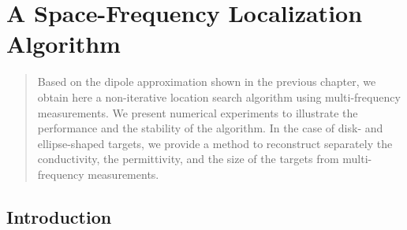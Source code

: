 \def\chapname{A Space-Frequency Localization Algorithm}
\chapter[\chapname]{
\chapname {}}
\label{chap:localization}

\begin{abstract}
Based on the dipole approximation shown in the previous chapter,
we obtain here a non-iterative location search algorithm using 
multi-frequency measurements. We
present numerical experiments to illustrate the performance and
the stability of the algorithm. In the case of disk- and 
ellipse-shaped
targets, we provide a method to reconstruct separately the
conductivity, the permittivity, and the size of the targets from
multi-frequency measurements.
\end{abstract}

\section{Introduction}

\label{sec:intro-localization}

